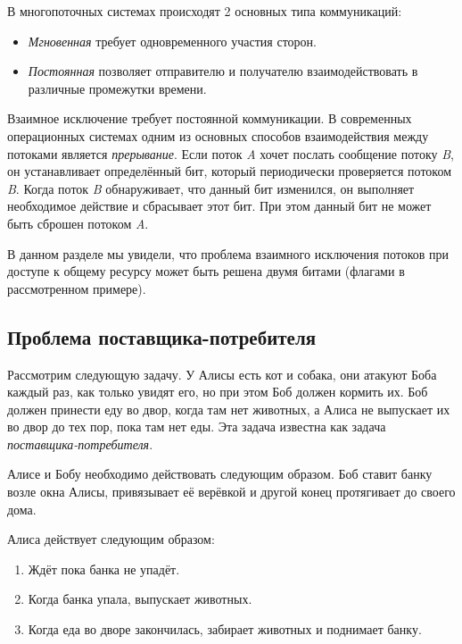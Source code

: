 В многопоточных системах происходят 2 основных типа коммуникаций:

\begin{itemize}
    \item \textit{Мгновенная} требует одновременного участия сторон.
    \item \textit{Постоянная} позволяет отправителю и получателю
    взаимодействовать в различные промежутки времени.
\end{itemize}

Взаимное исключение требует постоянной коммуникации. В современных операционных
системах одним из основных способов взаимодействия между потоками является
\textit{прерывание}. Если поток \textit{A} хочет послать сообщение потоку
\textit{B}, он устанавливает определённый бит, который периодически проверяется
потоком \textit{B}. Когда поток \textit{B} обнаруживает, что данный бит
изменился, он выполняет необходимое действие и сбрасывает этот бит. При этом
данный бит не может быть сброшен потоком \textit{A}.

В данном разделе мы увидели, что проблема взаимного исключения потоков при
доступе к общему ресурсу может быть решена двумя битами (флагами в
рассмотренном примере).

\subsection{Проблема поставщика-потребителя}
\label{1-3}

Рассмотрим следующую задачу. У Алисы есть кот и собака, они атакуют Боба каждый
раз, как только увидят его, но при этом Боб должен кормить их. Боб должен
принести еду во двор, когда там нет животных, а Алиса не выпускает их во двор до
тех пор, пока там нет еды. Эта задача известна как задача
\textit{поставщика-потребителя}.

Алисе и Бобу необходимо действовать следующим образом. Боб ставит банку возле
окна Алисы, привязывает её верёвкой и другой конец протягивает до своего дома.

Алиса действует следующим образом:

\begin{enumerate}
    \item Ждёт пока банка не упадёт.
    \item Когда банка упала, выпускает животных.
    \item Когда еда во дворе закончилась, забирает животных и поднимает банку.
\end{enumerate}

